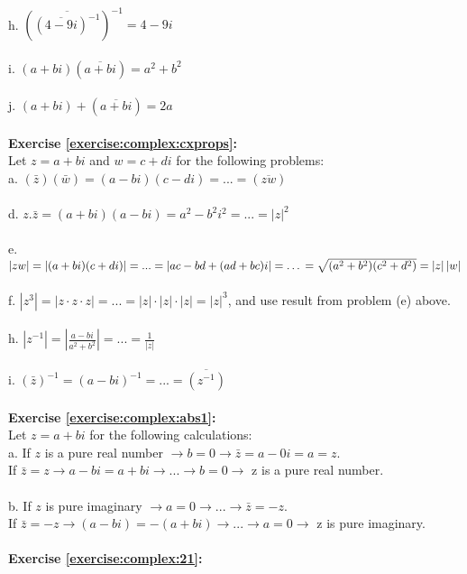 \\
h. $(\overline{(\overline{4-9i})^{-1}})^{-1}=4-9i$\\
\\
i. $(a+bi)(\overline{a+bi})=a^{2}+b^{2}$\\
\\
j. $(a+bi)+(\overline{a+bi})=2a$\\
\\
\textbf{Exercise \ref{exercise:complex:cxprops}:}\\
Let $z=a+bi$ and $w=c+di$ for the following problems:\\
a. $(\bar{z})(\bar{w})=(a-bi)(c-di)=...=(\overline{zw})$\\
\\
d. $z.\bar{z}=(a+bi)(a-bi)=a^{2}-b^{2}i^{2}=...=\left|z\right|^{2}$\\
\\
e. $\left|zw\right|=\left|(a+bi)(c+di)\right|=...=\left|ac-bd+(ad+bc)i\right|= \ldots \\
=\sqrt{(a^{2}+b^{2})(c^{2}+d^{2})}=\left|z\right|\left|w\right|$\\
\\
f. $\left|z^{3}\right|=\left|z\cdot z \cdot z\right|=...=\left|z\right|\cdot\left|z\right|\cdot\left|z\right|=\left|z\right|^{3}$, and use result from problem (e) above.\\
\\
h. $\left|z^{-1}\right|=\left|\displaystyle\frac{a-bi}{a^{2}+b^{2}}\right|=...=\displaystyle\frac{1}{\left|z\right|}$\\
\\
i. $(\bar{z})^{-1}=(a-bi)^{-1}=...=\overline{(z^{-1})}$\\
\\
\textbf{Exercise \ref{exercise:complex:abs1}:}\\
Let $z=a+bi$ for the following calculations:\\
a. If $z$ is a pure real number $\rightarrow b=0 \rightarrow \bar{z}=a-0i=a=z$.\\
If $\bar{z}=z \rightarrow a-bi=a+bi \rightarrow ... \rightarrow b=0 \rightarrow $ z is a pure real number.\\
\\
b. If $z$ is pure imaginary $\rightarrow a=0 \rightarrow ... \rightarrow \bar{z}=-z$.\\
If $\bar{z}=-z \rightarrow (a-bi)=-(a+bi) \rightarrow ... \rightarrow a=0 \rightarrow $ z is pure imaginary.\\
\\
\textbf{Exercise \ref{exercise:complex:21}:}\\
